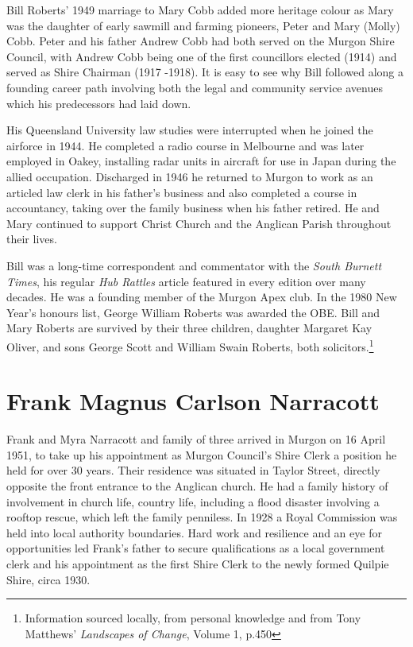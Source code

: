 Bill Roberts' 1949 marriage to Mary Cobb added more heritage colour as Mary was the daughter of early sawmill and farming pioneers, Peter and Mary (Molly) Cobb. Peter and his father Andrew Cobb had both served on the Murgon Shire Council, with Andrew Cobb being one of the first councillors elected (1914) and served as Shire Chairman (1917 -1918). It is easy to see why Bill followed along a founding career path involving both the legal and community service avenues which his predecessors had laid down.



His Queensland University law studies were interrupted when he joined the airforce in 1944. He completed a radio course in Melbourne and was later employed in Oakey, installing radar units in aircraft for use in Japan during the allied occupation. Discharged in 1946 he returned to Murgon to work as an articled law clerk in his father's business and also completed a course in accountancy, taking over the family business when his father retired. He and Mary continued to support Christ Church and the Anglican Parish throughout their lives.



Bill was a long-time correspondent and commentator with the \emph{South Burnett Times}, his regular \emph{Hub Rattles} article featured in every edition over many decades. He was a founding member of the Murgon Apex club. In the 1980 New Year's honours list, George William Roberts was awarded the OBE. Bill and Mary Roberts are survived by their three children, daughter Margaret Kay Oliver, and sons George Scott and William Swain Roberts, both solicitors.\footnote{Information sourced locally, from personal knowledge and from Tony Matthews' \emph{Landscapes of Change}, Volume 1, p.450}


\section{Frank Magnus Carlson Narracott}



Frank and Myra Narracott and family of three arrived in Murgon on 16 April 1951, to take up his appointment as Murgon Council's Shire Clerk a position he held for over 30 years. Their residence was situated in Taylor Street, directly opposite the front entrance to the Anglican church. He had a family history of involvement in church life, country life, including a flood disaster involving a rooftop rescue, which left the family penniless. In 1928 a Royal Commission was held into local authority boundaries. Hard work and resilience and an eye for opportunities led Frank's father to secure qualifications as a local government clerk and his appointment as the first Shire Clerk to the newly formed Quilpie Shire, circa 1930.



